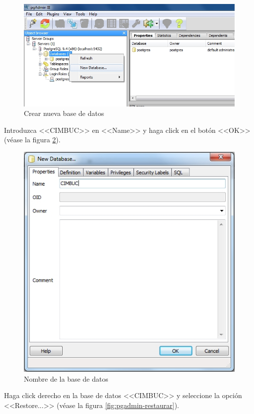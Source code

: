 \begin{figure}[H]
  \centering
  \includegraphics[width=1\linewidth]{./img/pgadmin-bd.jpg}
\caption[]{Crear nueva base de datos\label{fig:pgadmin-bd}}
\end{figure}

Introduzca <<CIMBUC>> en <<Name>> y haga click en el bot\'{o}n <<OK>> (v\'{e}ase la figura \ref{fig:pgadmin-bd-nombre}).

\begin{figure}[H]
  \centering
  \includegraphics[width=.5\linewidth]{./img/pgadmin-bd-nombre.jpg}
\caption[]{Nombre de la base de datos\label{fig:pgadmin-bd-nombre}}
\end{figure}

\newpage

Haga click derecho en la base de datos <<CIMBUC>> y seleccione la opci\'{o}n <<Restore...>> (v\'{e}ase la figura \ref{fig:pgadmin-restaurar}).

